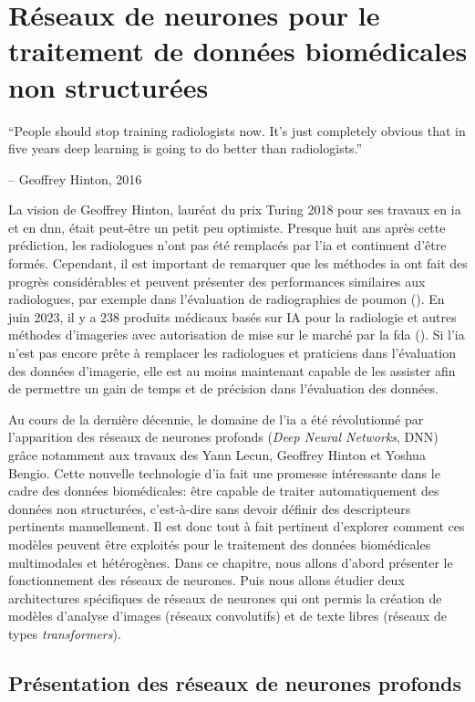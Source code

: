\chapter{Réseaux de neurones pour le traitement de données biomédicales non structurées}

\epigraph{\LARGE{``People should stop training radiologists now. It's just completely obvious that in five years deep learning is going to do better than radiologists.''}}{\LARGE{-- Geoffrey Hinton, 2016}}


La vision de Geoffrey Hinton, lauréat du prix Turing 2018 pour ses travaux en \gls{ia} et en \gls{dnn}, était peut-être un petit peu optimiste. Presque huit ans après cette prédiction, les radiologues n'ont pas été remplacés par l'\gls{ia} et continuent d'être formés. Cependant, il est important de remarquer que les méthodes \gls{ia} ont fait des progrès considérables et peuvent présenter des performances similaires aux radiologues, par exemple dans l'évaluation de radiographies de poumon (\cite{frauke_rudolf_ai_2023}). En juin 2023, il y a 238 produits médicaux basés sur IA pour la radiologie et autres méthodes d'imageries avec autorisation de mise sur le marché par la \gls{fda} (\cite{keith_j_dreyer_acr_2023}). Si l'\gls{ia} n'est pas encore prête à remplacer les radiologues et praticiens dans l'évaluation des données d'imagerie, elle est au moins maintenant capable de les assister afin de permettre un gain de temps et de précision dans l'évaluation des données.


Au cours de la dernière décennie, le domaine de l'\gls{ia} a été révolutionné par l'apparition des réseaux de neurones profonds (\textit{Deep Neural Networks}, DNN) grâce notamment aux travaux des Yann Lecun, Geoffrey Hinton et Yoshua Bengio. Cette nouvelle technologie d'\gls{ia} fait une promesse intéressante dans le cadre des données biomédicales: être capable de traiter automatiquement des données non structurées, c’est-à-dire sans devoir définir des descripteurs pertinents manuellement. Il est donc tout à fait pertinent d'explorer comment ces modèles peuvent être exploités pour le traitement des données biomédicales multimodales et hétérogènes. Dans ce chapitre, nous allons d'abord présenter le fonctionnement des réseaux de neurones. Puis nous allons étudier deux architectures spécifiques de réseaux de neurones qui ont permis la création de modèles d'analyse d'images (réseaux convolutifs)  et de texte libres (réseaux de types \textit{transformers}).

\section{Présentation des réseaux de neurones profonds}

